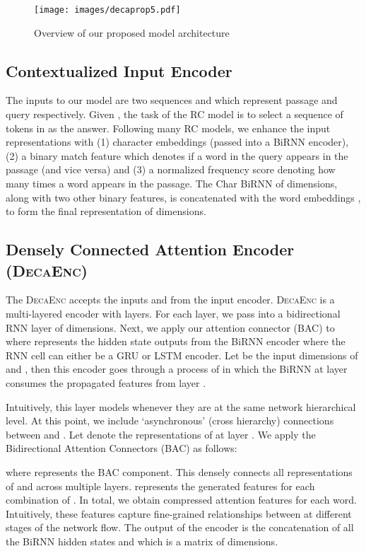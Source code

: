 \documentclass{article}
\begin{document}
\begin{figure}[ht]
  \centering
  \texttt{[image: images/decaprop5.pdf]}
  \caption{Overview of our proposed model architecture}\label{overview}
  \end{figure}

\subsection{Contextualized Input Encoder}
The inputs to our model are two sequences  and  which represent passage and query respectively. Given , the task of the RC model is to select a sequence of tokens in  as the answer. Following many RC models, we enhance the input representations with (1) character embeddings (passed into a BiRNN encoder), (2) a binary match feature which denotes if a word in the query appears in the passage (and vice versa) and (3) a normalized frequency score denoting how many times a word appears in the passage. The Char BiRNN of  dimensions, along with two other binary features, is concatenated with the word embeddings , to form the final representation of  dimensions.

\subsection{Densely Connected Attention Encoder (\textsc{DecaEnc})}
The \textsc{DecaEnc} accepts the inputs  and  from the input encoder. \textsc{DecaEnc} is a multi-layered encoder with  layers. For each layer, we pass  into a bidirectional RNN layer of  dimensions. Next, we apply our attention connector (BAC) to  where  represents the hidden state outputs from the BiRNN encoder where the RNN cell can either be a GRU or LSTM encoder. Let  be the input dimensions of  and , then this encoder goes through a process of  in which the BiRNN at layer  consumes the propagated features from layer .

Intuitively, this layer models  whenever they are at the same network hierarchical level. At this point, we include `asynchronous' (cross hierarchy) connections between  and . Let  denote the representations of  at layer . We apply the Bidirectional Attention Connectors (BAC) as follows:

where  represents the BAC component. This densely connects all representations of  and  across multiple layers.  represents the generated features for each  combination of . In total, we obtain  compressed attention features for each word. Intuitively, these features capture fine-grained relationships between  at different stages of the network flow. The output of the encoder is the concatenation of all the BiRNN hidden states  and  which is a matrix of  dimensions.
\end{document}
